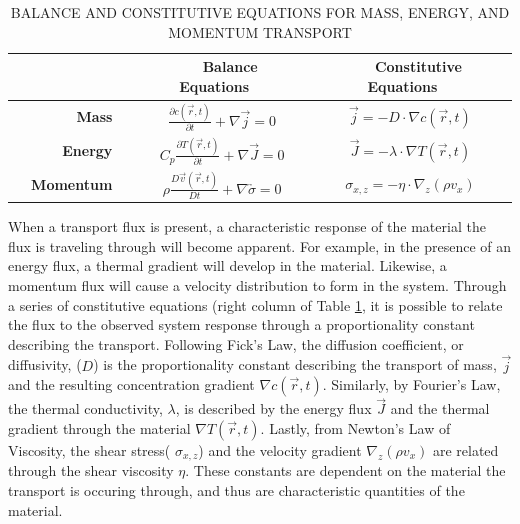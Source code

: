 \begin{table}
	\caption{BALANCE AND CONSTITUTIVE EQUATIONS FOR MASS, ENERGY, AND MOMENTUM TRANSPORT\label{tab:transport}}
        \begin{tabular}{rcc}
          \hline \hline
          & \textbf{~~Balance Equations~~} & \textbf{~~Constitutive Equations~~}\\ \hline 
          \textbf{~~Mass~~} & $\frac{\partial c (\vec{r}, t)}{\partial t} + \nabla \vec{j} = 0$ & $\vec{j} = -D \cdot \nabla c(\vec{r}, t)$\\
          \textbf{~~Energy~~} & $C_p \frac{\partial T (\vec{r}, t)}{\partial t} + \nabla \vec{J} = 0$ & $\vec{J} = -\lambda \cdot \nabla T(\vec{r}, t)$\\
          \textbf{~~Momentum~~} & $\rho \frac{D \vec{v}(\vec{r}, t)}{Dt}
                                  + \nabla \overleftrightarrow{\sigma} =
                                  0$ & $\sigma_{x,z} = -\eta \cdot
                                       \nabla_z (\rho v_x)$\\ \hline
          \hline
          \end{tabular}
\end{table}

When a transport flux is present, a characteristic response of the
material the flux is traveling through will become apparent. For
example, in the presence of an energy flux, a thermal gradient will
develop in the material. Likewise, a momentum flux will cause a
velocity distribution to form in the system. Through a series of
constitutive equations (right column of Table \ref{tab:transport}, it
is possible to relate the flux to the observed system response through
a proportionality constant describing the transport.  Following Fick's
Law, the diffusion coefficient, or diffusivity, ($D$) is the
proportionality constant describing the transport of mass, $\vec{j}$
and the resulting concentration gradient $\nabla c(\vec{r},
t)$. Similarly, by Fourier's Law, the thermal conductivity, $\lambda$,
is described by the energy flux $\vec{J}$ and the thermal gradient
through the material $\nabla T(\vec{r}, t)$. Lastly, from Newton's Law
of Viscosity, the shear stress( $\sigma_{x,z}$) and the velocity
gradient $\nabla_z (\rho v_x)$ are related through the shear viscosity
$\eta$. These constants are dependent on the material the transport is
occuring through, and thus are characteristic quantities of the
material.

